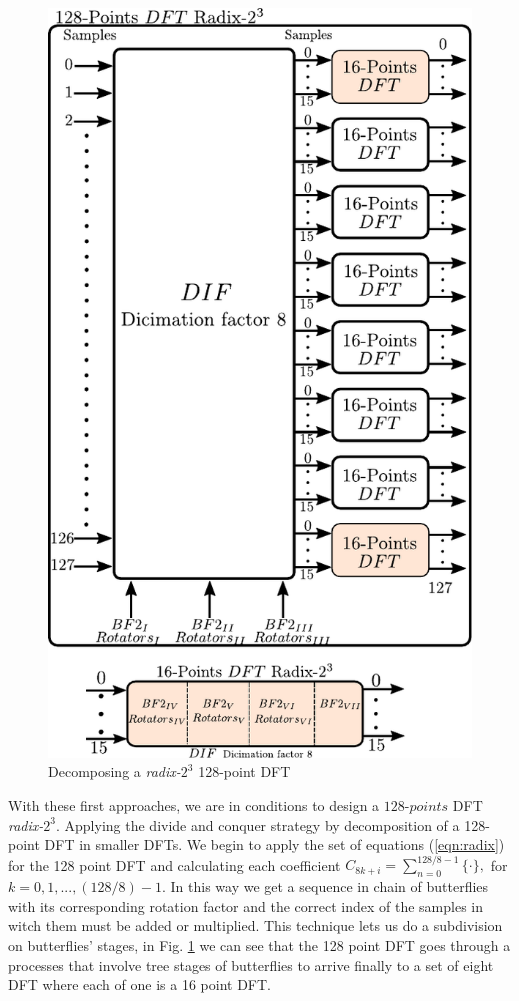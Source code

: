 \documentclass[journal,comsoc]{IEEEtran}
\begin{document}
\begin{figure}[t!]
	\centering
	\includegraphics[width=0.8\linewidth]{Diagramas/miSeccionFiguras/BloquesDft}
	\caption{Decomposing a \textit{radix-}$2^3$ 128-point DFT	}
	\label{fig:bloquesdft}
\end{figure}
With these first approaches, we are in conditions to design a $128$-$points$ DFT \textit{radix-}$2^3$. Applying the divide and conquer strategy by decomposition of a 128-point DFT in smaller DFTs. We begin to apply the set of equations (\ref{eqn:radix}) for the 128 point DFT and calculating each coefficient $C_{8k+i} = \sum_{n=0}^{128/8-1} \{ \cdot \}, $ for $k=0,1,...,(128/8)-1$. In this way we get a sequence in chain of butterflies with its corresponding rotation factor and the correct index of the samples in witch them must be added or multiplied. This technique lets us do a subdivision on butterflies' stages, in Fig. \ref{fig:bloquesdft} we can see that the 128 point DFT goes through a processes that involve tree stages of butterflies to arrive finally to a set of eight DFT where each of one is a 16 point DFT.
\end{document}
